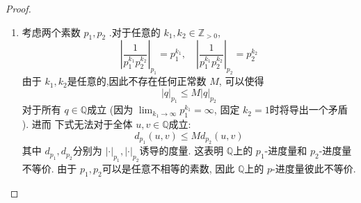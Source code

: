\documentclass[../main.tex]{subfiles}
\begin{document}
\begin{proof}
\begin{enumerate}
\begin{enumerate}
        \end{enumerate}
         因此 \(  \left| \cdot  \right|_{p}   \)是一个范数, 且满足以上乘性和强三角不等式. 
           \item 考虑两个素数 \(  p_1,p_2  \) .对于任意的 \(  k_1,k_2\in \mathbb{Z} _{> 0}  \), \[
    \left| \frac{1 }{p_1^{k_1}p_2^{k_2} }  \right|_{p_1}= p_1^{k_1},\quad \left| \frac{1 }{p_1^{k_1}p_2^{k_2} }  \right|_{p_2}= p_2^{k_2}
    \] 由于 \(  k_1,k_2  \)是任意的,因此不存在任何正常数 \(  M  \), 可以使得 \[
    \left|q \right|_{p_1}\le M\left| q \right|_{p_2}  
    \]  对于所有 \(  q \in \mathbb{Q}   \)成立 (因为 \(  \lim_{k_1\to \infty}p_1^{k_1}= \infty  \), 固定 \(  k_2= 1  \)时将导出一个矛盾  ). 进而 下式无法对于全体 \(  u,v \in \mathbb{Q}   \)成立: \[
     d _{p_1}\left( u,v \right)\le M d _{p_2}\left( u,v \right)  
    \] 其中 \(  d _{p_1}, d _{p_2}  \)分别为 \(  \left| \cdot  \right|_{p_1}, \left| \cdot  \right|_{p_2}    \)诱导的度量. 这表明 \(  \mathbb{Q}   \)上的 \(  p_1  \)-进度量和 \(  p_2  \)-进度量不等价. 由于 \(  p_1,p_2  \)可以是任意不相等的素数, 因此 \(  \mathbb{Q}   \)上的 \(  p  \)-进度量彼此不等价.        
    \end{enumerate}
   
    
\end{proof}
\end{document}
